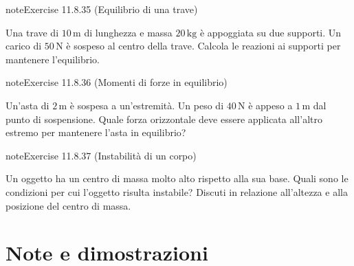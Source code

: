 \documentclass[letterpaper,10pt,italian]{jupyterBook}
\begin{document}
\begin{sphinxadmonition}{note}{Exercise 11.8.35 (Equilibrio di una trave)}



\sphinxAtStartPar
Una trave di \(10 \, \text{m}\) di lunghezza e massa \(20 \, \text{kg}\) è appoggiata su due supporti. Un carico di \(50 \, \text{N}\) è sospeso al centro della trave. Calcola le reazioni ai supporti per mantenere l’equilibrio.
\end{sphinxadmonition}
 \label{exercise:ch/mechanics/dynamics-problems-exercise-35}

\begin{sphinxadmonition}{note}{Exercise 11.8.36 (Momenti di forze in equilibrio)}



\sphinxAtStartPar
Un’asta di \(2 \, \text{m}\) è sospesa a un’estremità. Un peso di \(40 \, \text{N}\) è appeso a \(1 \, \text{m}\) dal punto di sospensione. Quale forza orizzontale deve essere applicata all’altro estremo per mantenere l’asta in equilibrio?
\end{sphinxadmonition}
 \label{exercise:ch/mechanics/dynamics-problems-exercise-36}

\begin{sphinxadmonition}{note}{Exercise 11.8.37 (Instabilità di un corpo)}



\sphinxAtStartPar
Un oggetto ha un centro di massa molto alto rispetto alla sua base. Quali sono le condizioni per cui l’oggetto risulta instabile? Discuti in relazione all’altezza e alla posizione del centro di massa.
\end{sphinxadmonition}

\sphinxstepscope


\section{Note e dimostrazioni}
\label{\detokenize{ch/mechanics/dynamics-notes:note-e-dimostrazioni}}\label{\detokenize{ch/mechanics/dynamics-notes:physics-hs-mechanics-dynamics-notes}}\label{\detokenize{ch/mechanics/dynamics-notes::doc}}
\end{document}
